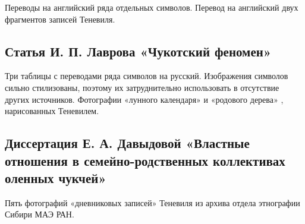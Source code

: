 \documentclass{article}
\begin{document}
Переводы на английский ряда отдельных символов. Перевод на английский двух фрагментов записей Теневиля.

\subsection{Статья И. П. Лаврова «Чукотский феномен»}

Три таблицы с переводами ряда символов на русский. Изображения символов сильно стилизованы, поэтому их затруднительно использовать в отсутствие других источников. Фотографии «лунного календаря» и «родового дерева» , нарисованных Теневилем.

\subsection{Диссертация Е. А. Давыдовой «Властные отношения в семейно-родственных коллективах оленных чукчей»}

Пять фотографий «дневниковых записей» Теневиля из архива отдела этнографии Сибири МАЭ РАН.

\printbibliography
\end{document}
